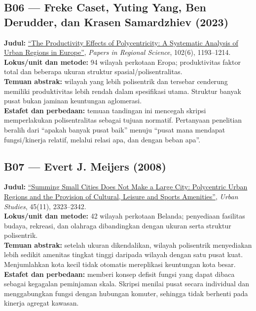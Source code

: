 \documentclass[
  indonesian,
  11pt,
  a4paper,
  oneside,
  openany]{report}
\begin{document}
\subsection{B06 --- Freke Caset, Yuting Yang, Ben Derudder, dan Krasen
Samardzhiev
(2023)}\label{b06-freke-caset-yuting-yang-ben-derudder-dan-krasen-samardzhiev-2023}

\textbf{Judul:} \href{https://doi.org/10.1111/pirs.12765}{``The
Productivity Effects of Polycentricity: A Systematic Analysis of Urban
Regions in Europe''}, \emph{Papers in Regional Science}, 102(6),
1193--1214.\\
\textbf{Lokus/unit dan metode:} 94 wilayah perkotaan Eropa;
produktivitas faktor total dan beberapa ukuran struktur
spasial/polisentralitas.\\
\textbf{Temuan abstrak:} wilayah yang lebih polisentrik dan tersebar
cenderung memiliki produktivitas lebih rendah dalam spesifikasi utama.
Struktur banyak pusat bukan jaminan keuntungan aglomerasi.\\
\textbf{Estafet dan perbedaan:} temuan tandingan ini mencegah skripsi
memperlakukan polisentralitas sebagai tujuan normatif. Pertanyaan
penelitian beralih dari ``apakah banyak pusat baik'' menuju ``pusat mana
mendapat fungsi/kinerja relatif, melalui relasi apa, dan dengan beban
apa''.

\subsection{B07 --- Evert J. Meijers
(2008)}\label{b07-evert-j.-meijers-2008}

\textbf{Judul:}
\href{https://doi.org/10.1177/0042098008095870}{``Summing Small Cities
Does Not Make a Large City: Polycentric Urban Regions and the Provision
of Cultural, Leisure and Sports Amenities''}, \emph{Urban Studies},
45(11), 2323--2342.\\
\textbf{Lokus/unit dan metode:} 42 wilayah perkotaan Belanda; penyediaan
fasilitas budaya, rekreasi, dan olahraga dibandingkan dengan ukuran
serta struktur polisentrik.\\
\textbf{Temuan abstrak:} setelah ukuran dikendalikan, wilayah
polisentrik menyediakan lebih sedikit amenitas tingkat tinggi daripada
wilayah dengan satu pusat kuat. Menjumlahkan kota kecil tidak otomatis
mereplikasi keuntungan kota besar.\\
\textbf{Estafet dan perbedaan:} memberi konsep defisit fungsi yang dapat
dibaca sebagai kegagalan peminjaman skala. Skripsi menilai pusat secara
individual dan menggabungkan fungsi dengan hubungan komuter, sehingga
tidak berhenti pada kinerja agregat kawasan.
\end{document}
